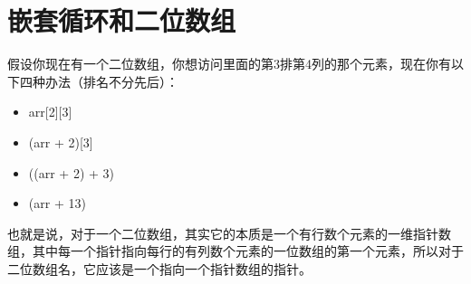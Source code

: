\section{嵌套循环和二位数组}

假设你现在有一个二位数组，你想访问里面的第3排第4列的那个元素，现在你有以下四种办法（排名不分先后）：

\begin{itemize}
\item arr[2][3]
\item \fira{*}(arr + 2)[3]
\item \fira{*}(\fira{*}(arr + 2) + 3)
\item \fira{*}(\fira{*}arr + 13)
\end{itemize}

也就是说，对于一个二位数组，其实它的本质是一个有行数个元素的一维指针数组，其中每一个指针指向每行的有列数个元素的一位数组的第一个元素，所以对于二位数组名，它应该是一个指向一个指针数组的指针。
